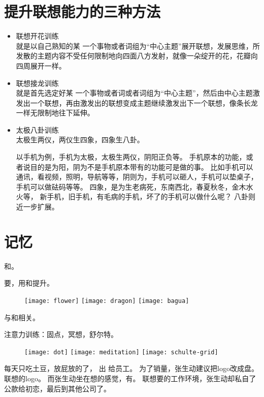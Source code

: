\section{提升联想能力的三种方法}

\begin{itemize}
\item 联想开花训练\\
  就是以自己熟知的某 一个事物或者词组为“中心主题”展开联想，发展思维，所发散的主题内容不受任何限制地向四面八方发射，就像一朵绽开的花，花瓣向四周展开一样。
\item 联想接龙训练\\
  就是首先选定好某 一个事物或者词或者词组为“中心主题”，然后由中心主题激发出一个联想，再由激发出的联想变成主题继续激发出下一个联想，像条长龙一样无限制地往下延伸。
\item 太极八卦训练\\
  太极生两仪，两仪生四象，四象生八卦。

  以手机为例，手机为太极，太极生两仪，阴阳正负等。
  手机原本的功能，或者说目的是为阳，阴为不是手机原本带有的功能可是做的事。
  比如手机可以通讯，看视频，照明，导航等等，阴则为，手机可以砸人，手机可以垫桌子，手机可以做砝码等等。
  四象，是为生老病死，东南西北，春夏秋冬，金木水火等，
  新手机，旧手机，有毛病的手机，坏了的手机可以做什么呢？
  八卦则近一步扩展。
\end{itemize}


\section{记忆}

和。

要，用和提升。
\begin{figure}[H]
  \centering
  \texttt{[image: flower]}
  \texttt{[image: dragon]}
  \texttt{[image: bagua]}  
\end{figure}
与和相关。

注意力训练：固点，冥想，舒尔特。

\begin{figure}[H]
  \centering
  \texttt{[image: dot]}
  \texttt{[image: meditation]}
  \texttt{[image: schulte-grid]}  
\end{figure}


\begin{tcolorbox}
  每天只吃土豆，放屁放的了，
  出 给员工。
  为了销量，张生动建议把logo改成盘。
  联想的logo。
  而张生动坐在想的感觉，有。
  联想要的工作环境，张生动却私自了公款给初恋，最后到其他公司了。
\end{tcolorbox}

